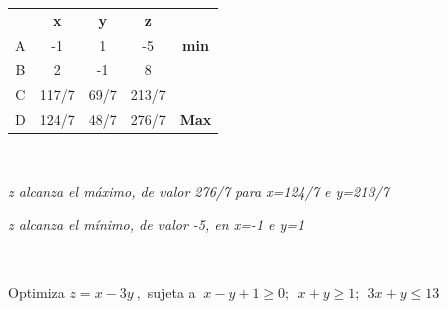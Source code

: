 \vspace{5mm}
\begin{multicols}{2}
\begin{table}[H]
\centering
\begin{tabular}{ccccc}
\textbf{} & \textbf{x} & \textbf{y} & \textbf{z} & \textbf{}    \\
A         & -1         & 1          & -5         & \textbf{min} \\
B         & 2          & -1         & 8          &              \\
C         & 117/7      & 69/7       & 213/7      &              \\
D         & 124/7      & 48/7       & 276/7      & \textbf{Max}
\end{tabular}
\end{table}	
$\quad$

\emph{z alcanza el máximo, de valor 276/7 para x=124/7 e y=213/7}

\vspace{4mm}

\emph{z alcanza el mínimo, de valor -5, en x=-1 e y=1}

$\quad$

\end{multicols}

 



\vspace{5mm}%
\begin{ejemplo}
\begin{ejer}
	Optimiza $z=x-3y \ , $ sujeta a  $ \ x-y+1\ge 0 ; \  \ x+y\ge 1 ;\  \ 3x+y\le 13 $
\end{ejer}	
\end{ejemplo}
\vspace{3mm}%


